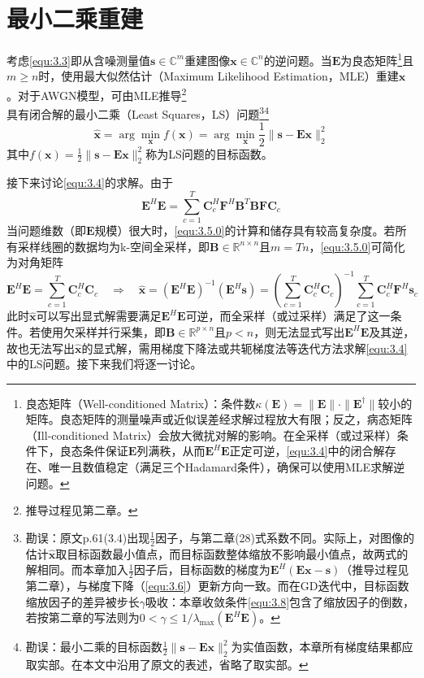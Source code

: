 \documentclass[12pt]{article}
\begin{document}
\section{最小二乘重建}
考虑\autoref{equ:3.3}即从含噪测量值$\bm{s}\in\mathbb{C}^m$重建图像$\bm{x}\in\mathbb{C}^n$的逆问题。当$\mathbf{E}$为良态矩阵\footnote{良态矩阵（Well-conditioned Matrix）：条件数$\kappa(\mathbf{E})=\|\mathbf{E}\|\cdot\|\mathbf{E}^{\dagger}\|$较小的矩阵。良态矩阵的测量噪声或近似误差经求解过程放大有限；反之，病态矩阵（Ill-conditioned Matrix）会放大微扰对解的影响。在全采样（或过采样）条件下，良态条件保证$\mathbf{E}$列满秩，从而$\mathbf{E}^H\mathbf{E}$正定可逆，\autoref{equ:3.4}中的闭合解存在、唯一且数值稳定（满足三个Hadamard条件），确保可以使用MLE求解逆问题。}且$m\ge n$时，使用最大似然估计（Maximum Likelihood Estimation，MLE）\label{term:MLE}重建$\bm{x}$。对于AWGN模型，可由MLE推导\footnote{推导过程见第二章。}具有闭合解的最小二乘（Least Squares，LS）\label{term:LS}问题\footnote{勘误：原文p.61(3.4)出现$\frac{1}{2}$因子，与第二章(28)式系数不同。实际上，对图像的估计$\hat{\bm{x}}$取目标函数最小值点，而目标函数整体缩放不影响最小值点，故两式的解相同。而本章加入$\frac{1}{2}$因子后，目标函数的梯度为$\mathbf{E}^H(\mathbf{E}\bm{x}-\bm{s})$（推导过程见第二章），与梯度下降（\autoref{equ:3.6}）更新方向一致。而在GD迭代中，目标函数缩放因子的差异被步长$\gamma$吸收：本章收敛条件\autoref{equ:3.8}包含了缩放因子的倒数，若按第二章的写法则为$0<\gamma\le 1/\lambda_{\max}(\mathbf{E}^H\mathbf{E})$。}\footnote{勘误：最小二乘的目标函数$\frac{1}{2}\|\bm{s}-\mathbf{E}\bm{x}\|_2^2$为实值函数，本章所有梯度结果都应取实部。在本文中沿用了原文的表述，省略了取实部。}
\begin{equation}
    \hat{\bm{x}}=\arg\min_{\bm{x}}f(\bm{x})=\arg\min_{\bm{x}}\frac{1}{2}\|\bm{s}-\mathbf{E}\bm{x}\|_2^2
    \label{equ:3.4}
\end{equation}
其中$f(\bm{x})=\frac{1}{2}\|\bm{s}-\mathbf{E}\bm{x}\|_2^2$称为LS问题的目标函数。

接下来讨论\autoref{equ:3.4}的求解。由于
\begin{equation}
    \mathbf{E}^H\mathbf{E}=\sum_{c=1}^T \mathbf{C}_c^H\mathbf{F}^H\mathbf{B}^T\mathbf{B}\mathbf{F}\mathbf{C}_c
    \label{equ:3.5.0}
\end{equation}
当问题维数（即$\mathbf{E}$规模）很大时，\autoref{equ:3.5.0}的计算和储存具有较高复杂度。若所有采样线圈的数据均为k-空间全采样，即$\mathbf{B}\in\mathbb{R}^{n\times n}$且$m=Tn$，\autoref{equ:3.5.0}可简化为对角矩阵
\begin{equation}
    \mathbf{E}^H\mathbf{E}=\sum_{c=1}^T \mathbf{C}_c^H\mathbf{C}_c
    \quad\Rightarrow\quad
    \hat{\bm{x}}=(\mathbf{E}^H\mathbf{E})^{-1}(\mathbf{E}^H\bm{s})=\left(\sum_{c=1}^{T} \mathbf{C}_c^H\mathbf{C}_c\right)^{-1}\sum_{c=1}^{T} \mathbf{C}_c^H\mathbf{F}^H\bm{s}_c
    \label{equ:3.5}
\end{equation}
此时$\hat{\bm{x}}$可以写出显式解需要满足$\mathbf{E}^H\mathbf{E}$可逆，而全采样（或过采样）满足了这一条件。若使用欠采样并行采集，即$\mathbf{B}\in\mathbb{R}^{p\times n}$且$p<n$，则无法显式写出$\mathbf{E}^H\mathbf{E}$及其逆，故也无法写出$\hat{\bm{x}}$的显式解，需用梯度下降法或共轭梯度法等迭代方法求解\autoref{equ:3.4}中的LS问题。接下来我们将逐一讨论。
\end{document}
